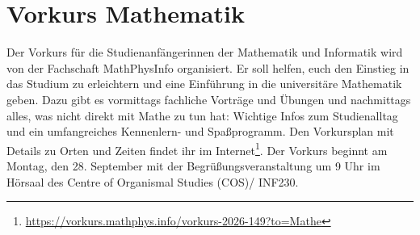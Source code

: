 \section{Vorkurs Mathematik}
Der Vorkurs für die Studienanfängerinnen der Mathematik und Informatik wird von der Fachschaft MathPhysInfo organisiert. Er soll helfen, euch den Einstieg in das Studium zu erleichtern und eine Einführung in die universitäre Mathematik geben. Dazu gibt es vormittags fachliche Vorträge und Übungen und nachmittags alles, was nicht direkt mit Mathe zu tun hat: Wichtige Infos zum Studienalltag und ein umfangreiches Kennenlern- und Spaßprogramm. Den Vorkursplan mit Details zu Orten und Zeiten findet ihr im Internet\footnote{\label{mathe-vorkursplan}\url{https://vorkurs.mathphys.info/vorkurs-2026-149?to=Mathe}}. Der Vorkurs beginnt am Montag, den 28. September mit der Begrüßungsveranstaltung um 9 Uhr im Hörsaal des Centre of Organismal Studies (COS)/ INF230.
